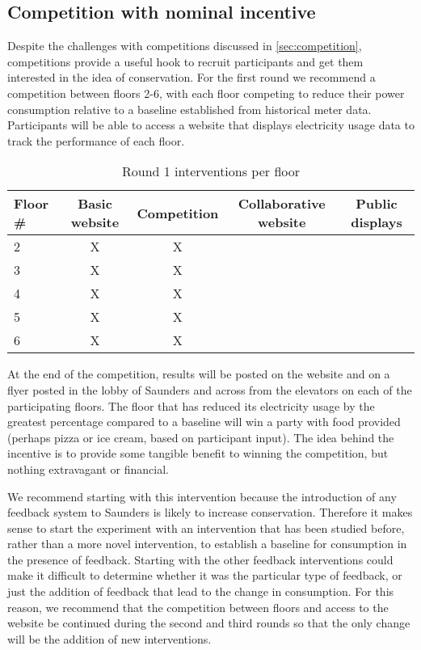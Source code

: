 \documentclass[11pt]{article}
\begin{document}
\subsection{Competition with nominal incentive}

Despite the challenges with competitions discussed in \autoref{sec:competition}, competitions provide a useful hook to recruit participants and get them interested in the idea of conservation. For the first round we recommend a competition between floors 2-6, with each floor competing to reduce their power consumption relative to a baseline established from historical meter data. Participants will be able to access a website that displays electricity usage data to track the performance of each floor.

\begin{table}[htbp]
	\centering
		\begin{tabular}{| l || c | c | c | c |}
			\hline
			Floor \# & Basic website & Competition & Collaborative website & Public displays \tabularnewline \hline \hline
			
			2 & X & X &  & \tabularnewline \hline
			
			3 & X & X &  & \tabularnewline \hline

			4 & X & X &  & \tabularnewline \hline

			5 & X & X &  & \tabularnewline \hline
			
			6 & X & X &  & \tabularnewline \hline
		\end{tabular}
	\caption{Round 1 interventions per floor}
	\label{tab:round1-per-floor}
\end{table}

At the end of the competition, results will be posted on the website and on a flyer posted in the lobby of Saunders and across from the elevators on each of the participating floors. The floor that has reduced its electricity usage by the greatest percentage compared to a baseline will win a party with food provided (perhaps pizza or ice cream, based on participant input). The idea behind the incentive is to provide some tangible benefit to winning the competition, but nothing extravagant or financial.

We recommend starting with this intervention because the introduction of any feedback system to Saunders is likely to increase conservation. Therefore it makes sense to start the experiment with an intervention that has been studied before, rather than a more novel intervention, to establish a baseline for consumption in the presence of feedback. Starting with the other feedback interventions could make it difficult to determine whether it was the particular type of feedback, or just the addition of feedback that lead to the change in consumption. For this reason, we recommend that the competition between floors and access to the website be continued during the second and third rounds so that the only change will be the addition of new interventions.
\end{document}
